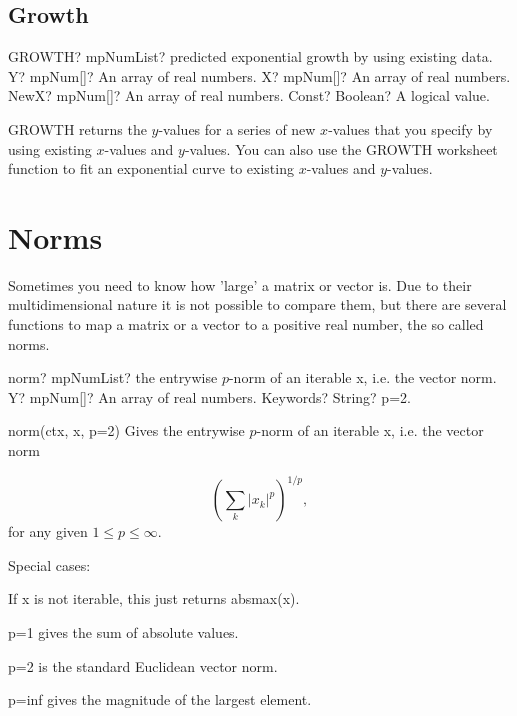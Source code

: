 \subsection{Growth}

\begin{mpFunctionsExtract}
	\mpWorksheetFunctionFourNotImplemented
	{GROWTH? mpNumList? predicted exponential growth by using existing data.}
	{Y? mpNum[]? An array of real numbers.}
	{X? mpNum[]? An array of real numbers.}
	{NewX? mpNum[]? An array of real numbers.}
	{Const? Boolean? A logical value.}
\end{mpFunctionsExtract}

\vspace{0.3cm}
\textsf{GROWTH} returns the $y$-values for a series of new $x$-values that you specify by using existing $x$-values and $y$-values. You can also use the \textsf{GROWTH} worksheet function to fit an exponential curve to existing $x$-values and $y$-values.



\newpage
\section{Norms}
Sometimes you need to know how 'large' a matrix or vector is. Due to their multidimensional nature it is not possible to compare them, but there are several functions to map a matrix or a vector to a positive real number, the so called norms.

\vpara
\begin{mpFunctionsExtract}
	\mpFunctionTwo
	{norm? mpNumList? the entrywise $p$-norm of an iterable x, i.e. the vector norm.}
	{Y? mpNum[]? An array of real numbers.}
	{Keywords? String?  p=2.}
\end{mpFunctionsExtract}


norm(ctx, x, p=2)
Gives the entrywise $p$-norm of an iterable x, i.e. the vector norm 

\begin{equation}
	\left( \sum_k |x_k|^p \right)^{1/p},
\end{equation}
for any given $1 \leq p \leq \infty$.

Special cases:

If x is not iterable, this just returns absmax(x).

p=1 gives the sum of absolute values.

p=2 is the standard Euclidean vector norm.

p=inf gives the magnitude of the largest element.

